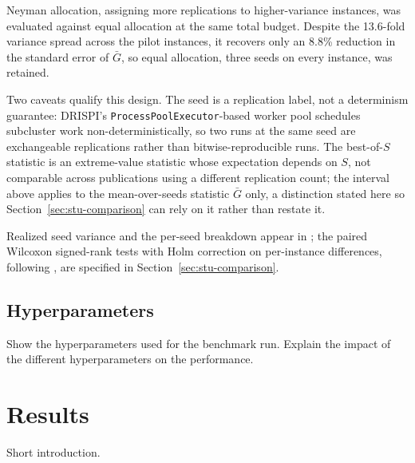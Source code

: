Neyman allocation, assigning more replications to higher-variance instances, was evaluated against equal allocation at the same total budget. Despite the 13.6-fold variance spread across the pilot instances, it recovers only an 8.8\% reduction in the standard error of $\bar G$, so equal allocation, three seeds on every instance, was retained.

Two caveats qualify this design. The seed is a replication label, not a determinism guarantee: DRISPI's \texttt{ProcessPoolExecutor}-based worker pool schedules subcluster work non-deterministically, so two runs at the same seed are exchangeable replications rather than bitwise-reproducible runs. The best-of-$S$ statistic is an extreme-value statistic whose expectation depends on $S$, not comparable across publications using a different replication count; the interval above applies to the mean-over-seeds statistic $\bar G$ only, a distinction stated here so Section~\ref{sec:stu-comparison} can rely on it rather than restate it.

Realized seed variance and the per-seed breakdown appear in ; the paired Wilcoxon signed-rank tests with Holm correction on per-instance differences, following \citet{demsVarStatisticalComparisonsClassifiers}, are specified in Section~\ref{sec:stu-comparison}.

\subsection{Hyperparameters}\label{sec:stu-hyperparameters}
Show the hyperparameters used for the benchmark run. Explain the impact of the different hyperparameters on the performance.

\section{Results}\label{sec:stu-results}
Short introduction.

